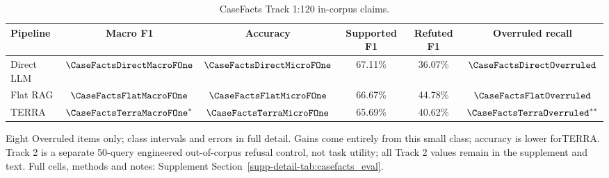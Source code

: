 \begin{table}[!t]
\caption{CaseFacts Track 1:120 in-corpus claims.}
\label{tab:casefacts_eval}
\centering\begingroup\fontsize{8}{9.6}\selectfont\setlength{\tabcolsep}{3pt}\renewcommand{\arraystretch}{1.15}
\begin{tabular}{lccccc}
\toprule
Pipeline & Macro F1 & Accuracy & Supported F1 & Refuted F1 & Overruled recall \\
\midrule
Direct LLM & $\CaseFactsDirectMacroFOne$ & $\CaseFactsDirectMicroFOne$ & 67.11\% & 36.07\% & $\CaseFactsDirectOverruled$ \\
Flat RAG & $\CaseFactsFlatMacroFOne$ & $\CaseFactsFlatMicroFOne$ & 66.67\% & 44.78\% & $\CaseFactsFlatOverruled$ \\
TERRA & $\CaseFactsTerraMacroFOne^*$ & $\CaseFactsTerraMicroFOne$ & 65.69\% & 40.62\% & $\CaseFactsTerraOverruled^{**}$ \\
\bottomrule
\end{tabular}
\endgroup\par\vspace{2pt}
\raggedright\footnotesize Eight Overruled items only; class intervals and errors in full detail. Gains come entirely from this small class; accuracy is lower forTERRA. Track 2 is a separate 50-query engineered out-of-corpus refusal control, not task utility; all Track 2 values remain in the supplement and text. Full cells, methods and notes: Supplement Section~\ref{supp-detail-tab:casefacts_eval}.
\end{table}
